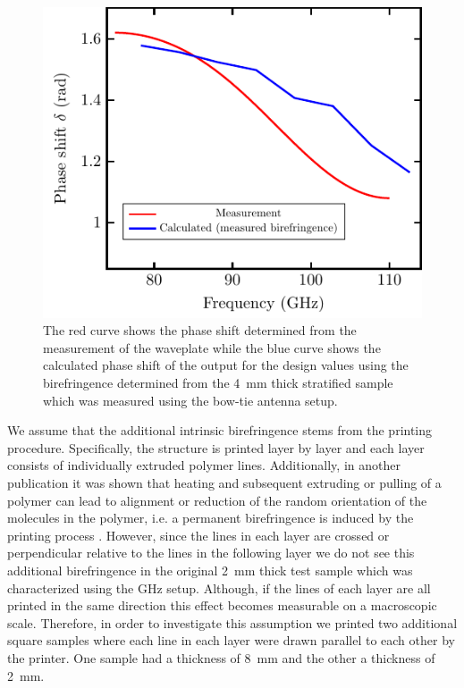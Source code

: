 \begin{figure}[H]
    \centering
    \includegraphics[scale=.65]{images/results/plots/polymer/delta_gratings_bf.pdf}
    \caption{The red curve shows the phase shift determined from the measurement of the waveplate while the blue curve shows the calculated phase shift of the output for the design values using the birefringence determined from the \SI{4}{\milli \meter} thick stratified sample which was measured using the bow-tie antenna setup.}
    \label{fig:delta_gratings_bf}
\end{figure}

We assume that the additional intrinsic birefringence stems from the printing procedure.
Specifically, the structure is printed layer by layer and each layer consists of individually extruded polymer lines. Additionally, in another publication it was shown that heating and subsequent extruding or pulling of a polymer can lead to alignment or reduction of the random orientation of the molecules in the polymer, i.e. a permanent birefringence is induced by the printing process \cite{Solr-urn:nbn:de:hebis:04-z2017-0786}. However, since the lines in each layer are crossed or perpendicular relative to the lines in the following layer we do not see this additional birefringence in the original \SI{2}{\milli \meter} thick test sample which was characterized using the GHz setup. Although, if the lines of each layer are all printed in the same direction this effect becomes measurable on a macroscopic scale. Therefore, in order to investigate this assumption we printed two additional square samples where each line in each layer were drawn parallel to each other by the printer. One sample had a thickness of \SI{8}{\milli \meter} and the other a thickness of \SI{2}{\milli \meter}. 

